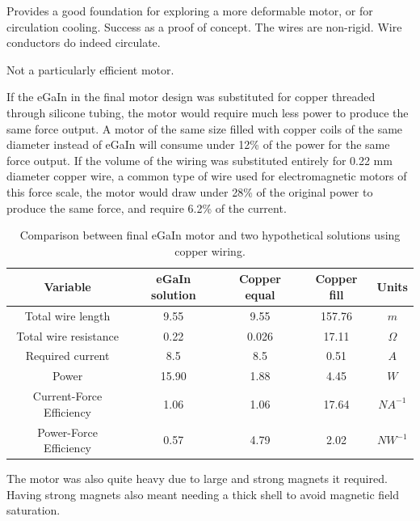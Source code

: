 \documentclass[a4paper,12pt]{article}
\begin{document}
Provides a good foundation for exploring a more deformable motor, or for circulation cooling.
Success as a proof of concept. The wires are non-rigid. Wire conductors do indeed circulate.

Not a particularly efficient motor.

If the eGaIn in the final motor design was substituted for copper threaded through silicone tubing, the motor would require much less power to produce the same force output. A motor of the same size filled with copper coils of the same diameter instead of eGaIn will consume under 12\% of the power for the same force output. If the volume of the wiring was substituted entirely for 0.22 mm diameter copper wire, a common type of wire used for electromagnetic motors of this force scale, the motor would draw under 28\% of the original power to produce the same force, and require 6.2\% of the current.
\begin{table}[h!]
    \centering
    \caption{Comparison between final eGaIn motor and two hypothetical solutions using copper wiring.}
    \label{tb:coppercompare}
    \begin{tabular}{S | c | c | c | c}
        \hline
        \textbf{Variable} & \textbf{eGaIn solution} & \textbf{Copper equal} & \textbf{Copper fill} & \textbf{Units} \\ [0.5ex]
        \hline\hline
        Total wire length & 9.55 & 9.55 & 157.76 & $m$ \\
        \hline
        Total wire resistance & 0.22 & 0.026 & 17.11 & $\Omega$ \\
        \hline
        Required current & 8.5 & 8.5 & 0.51 & $A$ \\
        \hline
        Power & 15.90 & 1.88 & 4.45 & $W$ \\
        \hline
        Current-Force Efficiency & 1.06 & 1.06 & 17.64 & $NA^{-1}$ \\
        \hline
        Power-Force Efficiency & 0.57 & 4.79 & 2.02 & $NW^{-1}$ \\
        \hline
    \end{tabular}
\end{table}

The motor was also quite heavy due to large and strong magnets it required. Having strong magnets also meant needing a thick shell to avoid magnetic field saturation.
\end{document}

